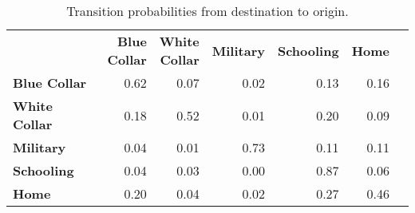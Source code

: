 \begin{ThreePartTable}

	\begin{longtable}[c]{@{}lrrrrrr@{}}
		\caption{Transition probabilities from destination to origin.}
		\label{tab:TransitionProbabilitiesDestinationToOrigin}

		\setlength\extrarowheight{2.5pt}
		
		\\
		\toprule
   & \thead{\textbf{Blue} \\ \textbf{Collar}}    & \thead{\textbf{White} \\ \textbf{Collar}}  & \textbf{Military} & \textbf{Schooling} & \textbf{Home}   \\ \midrule
		\endfirsthead
		
\textbf{Blue	 Collar }&	0.62	&	0.07	&	0.02	&	0.13	&	0.16	\\
\textbf{White Collar	}&	0.18	&	0.52	&	0.01	&	0.20	&	0.09	\\
\textbf{Military}	&	0.04	&	0.01	&	0.73	&	0.11	&	0.11	\\
\textbf{Schooling}	&	0.04	&	0.03	&	0.00	&	0.87	&	0.06	\\
\textbf{Home}	&	0.20	&	0.04	&	0.02	&	0.27	&	0.46	\\
  \bottomrule
	\end{longtable}
\end{ThreePartTable}
